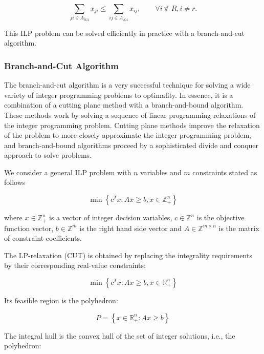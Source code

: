 \documentclass{SMBV12}
\begin{document}
\begin{equation}
\sum\limits_{ji \in A_{SA}} x_{ji} \leq \sum\limits_{ij \in A_{SA}} x_{ij}, \qquad \forall i \notin R, i \neq r.
\end{equation}

This ILP problem can be solved efficiently in practice with a branch-and-cut algorithm.

\subsubsection{Branch-and-Cut Algorithm}

The branch-and-cut algorithm is a very successful technique for solving a wide variety of integer programming problems to optimality. In essence, it is a combination of a cutting plane method with a branch-and-bound algorithm. These methods work by solving a sequence of linear programming relaxations of the integer programming
problem. Cutting plane methods improve the relaxation of the problem to more closely approximate the integer programming problem, and branch-and-bound algorithms proceed by a sophisticated divide and conquer approach to solve problems.

We consider a general ILP problem with $n$ variables and $m$ constraints stated as follows

\begin{equation}
\min \left\lbrace c^Tx : Ax \geq b, x \in \mathbb{Z}_+^n \right\rbrace 
\end{equation}

where $x \in \mathbb{Z}_+^n$ is a vector of integer decision variables, $c \in \mathbb{Z}^n$ is the objective function vector, $b \in \mathbb{Z}^m$ is the right hand side vector and $A \in \mathbb{Z}^{m \times n}$ is the matrix of constraint coefficients.

The LP-relaxation (CUT) is obtained by replacing the integrality requirements by their corresponding real-value constraints:

\begin{equation}
\min \left\lbrace c^Tx : Ax \geq b, x \in \mathbb{R}_+^n \right\rbrace 
\end{equation}

Its feasible region is the polyhedron:

\begin{equation}
P = \left\lbrace x \in \mathbb{R}_+^n : Ax \geq b \right\rbrace 
\end{equation}

The integral hull is the convex hull of the set of integer solutions, i.e., the polyhedron:
\end{document}
